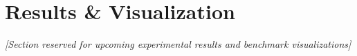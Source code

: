 \section{Results \& Visualization}

\noindent\textit{[Section reserved for upcoming experimental results and benchmark visualizations]}


